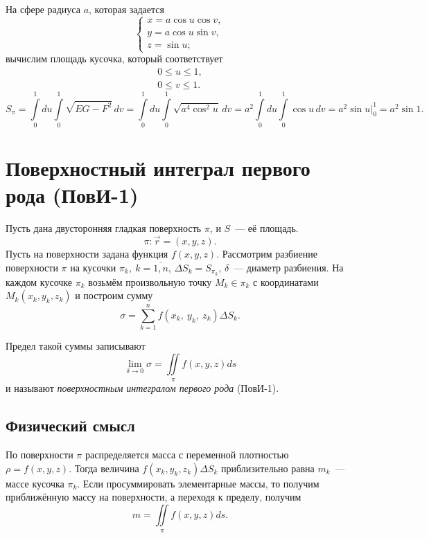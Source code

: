 \documentclass[../../main.tex]{subfiles}
\begin{document}
\begin{exmp}
На сфере радиуса $a$, которая задается
\[
\begin{cases}
 x = a\cos u\cos v, \\
 y = a\cos u\sin v,\\
 z = \sin u;
\end{cases}\]
вычислим площадь кусочка, который соответствует
\begin{gather*}
0 \leq u \leq 1, \\ 0 \leq v \leq 1.
\end{gather*}
\[
 S_\pi = \int\limits_0^1du\int\limits_0^1\sqrt{EG-F^2}\,dv = 
 \int\limits_0^1du\int\limits_0^1\sqrt{a^4\cos^2u}\,dv = 
 a^2\int\limits_0^1du\int\limits_0^1\cos u\,dv = a^2\sin u\big|_0^1 = a^2\sin 
 1.
\]
\end{exmp}

\section{Поверхностный интеграл первого рода (ПовИ-1)}

Пусть дана двусторонняя гладкая поверхность $\pi$, и $S$~--- её площадь. \[\pi 
: 
\vec{r} = (x, y, z).\]
Пусть на поверхности задана функция $f(x, y, z)$. 
Рассмотрим разбиение поверхности $\pi$ на кусочки $\pi_k,\ k = \overline{1, 
n}$, $\Delta 
S_k = S_{\pi_k}$, $\delta$~--- диаметр разбиения. На каждом кусочке $\pi_k$ 
возьмём произвольную точку $M_k \in \pi_k$ с координатами $M_k(x_k, y_k, z_k)$ 
и 
построим сумму \[\sigma = \sum\limits_{k = 1}^nf(x_k, \ y_k, \ z_k)\Delta 
S_k.\]

Предел такой суммы записывают
\[\lim\limits_{\delta\rightarrow0}\sigma = \iint\limits_\pi f(x, y, 
z)ds\] и называют \emph{поверхностным интегралом первого рода} (ПовИ-1).

\subsection{Физический смысл}
По поверхности $\pi$ распределяется масса с переменной плотностью $\rho = f(x, 
y, z)$. Тогда величина $f(x_k, y_k, z_k)\Delta S_k$ 
приблизительно равна $m_k$~--- массе кусочка $\pi_k$. Если просуммировать 
элементарные массы, то получим приближённую массу на поверхности, а переходя к 
пределу, получим \[m = \iint\limits_\pi f(x, y, z)ds.\]
\end{document}
